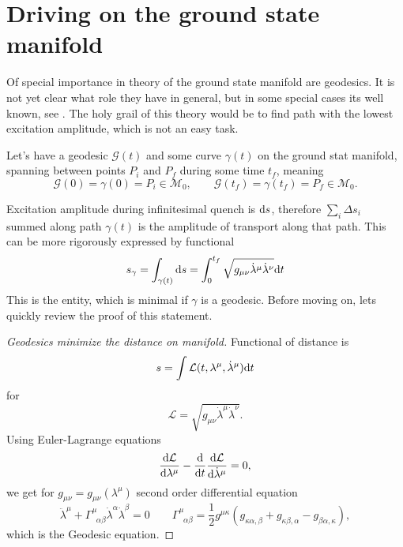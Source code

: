 \chapter{Driving on the ground state manifold}
Of special importance in theory of the ground state manifold are geodesics. It is not yet clear what role they have in general, but in some special cases its well known, see \cite{polkovnikov}. The holy grail of this theory would be to find path with the lowest excitation amplitude, which is not an easy task.

Let's have a geodesic $\mathcal{G}(t)$ and some curve $\gamma(t)$ on the ground stat manifold, spanning between points $P_i$ and $P_f$ during some time $t_f$, meaning
 $$\mathcal{G}(0)=\gamma(0)=P_i\in\mathcal{M}_0,\qquad \mathcal{G}(t_f)=\gamma(t_f)=P_f\in\mathcal{M}_0.$$

Excitation amplitude during infinitesimal quench is $\mathrm{d} s$, therefore $\sum_i \Delta s_i$ summed along path $\gamma(t)$ is the amplitude of transport along that path. This can be more rigorously expressed by functional
\begin{equation}
    s_\gamma=\int_{\gamma(t)}\mathrm{d} s=\int_{0}^{t_f}\sqrt{g_{\mu\nu}\dot\lambda^\mu\dot\lambda^\nu}\mathrm{d} t
\end{equation}
This is the entity, which is minimal if $\gamma$ is a geodesic. Before moving on, lets quickly review the proof of this statement.

\begin{proof}[Geodesics minimize the distance on manifold]
    Functional of distance is
    \begin{equation}
        s=\int\mathcal{L}(t,\lambda^\mu,\dot\lambda^\mu)\mathrm{d} t
    \end{equation}
    for 
    \begin{equation}
        \mathcal{L}=\sqrt{g_{\mu\nu}\dot\lambda^\mu\dot\lambda^\nu}.
    \end{equation}
    Using Euler-Lagrange equations 
    \begin{equation}
        \frac{\mathrm{d} \mathcal{L}}{\mathrm{d} \lambda^\mu}-\frac{\mathrm{d} }{\mathrm{d} t}\frac{\mathrm{d} \mathcal{L}}{\mathrm{d} \dot\lambda^\mu}=0,
    \end{equation}
    we get for $g_{\mu\nu}=g_{\mu\nu}(\lambda^\mu)$ second order differential equation
    \begin{equation}
        \ddot\lambda^\mu+\Gamma^\mu_{\;\;\alpha\beta}\dot\lambda^\alpha\dot\lambda^\beta=0\qquad \Gamma^\mu_{\;\;\alpha\beta}=\frac{1}{2}g^{\mu\kappa}\left(g_{\kappa\alpha,\beta}+g_{\kappa\beta,\alpha}-g_{\beta\alpha,\kappa}\right),
        \label{eq:geodesicEquaiton}
    \end{equation}
    which is the Geodesic equation.
\end{proof}

